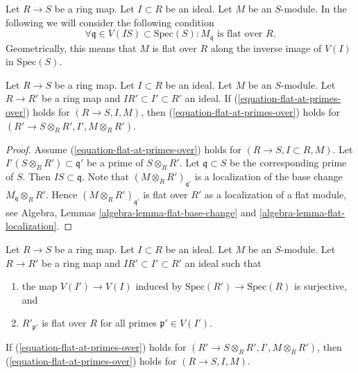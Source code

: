 \noindent
Let $R \to S$ be a ring map.
Let $I \subset R$ be an ideal.
Let $M$ be an $S$-module.
In the following we will consider the following condition
\begin{equation}
\label{equation-flat-at-primes-over}
\forall \mathfrak q \in V(IS) \subset \text{Spec}(S) :
M_{\mathfrak q}\text{ is flat over }R.
\end{equation}
Geometrically, this means that $M$ is flat over $R$ along the inverse
image of $V(I)$ in $\text{Spec}(S)$.

\begin{lemma}
\label{lemma-base-change-flat-at-primes-over}
Let $R \to S$ be a ring map.
Let $I \subset R$ be an ideal.
Let $M$ be an $S$-module.
Let $R \to R'$ be a ring map and $IR' \subset I' \subset R'$ an ideal.
If (\ref{equation-flat-at-primes-over}) holds for
$(R \to S, I, M)$, then (\ref{equation-flat-at-primes-over})
holds for $(R' \to S \otimes_R R', I', M \otimes_R R')$.
\end{lemma}

\begin{proof}
Assume (\ref{equation-flat-at-primes-over}) holds for
$(R \to S, I \subset R, M)$.
Let $I'(S \otimes_R R') \subset \mathfrak q'$ be a prime of $S \otimes_R R'$.
Let $\mathfrak q \subset S$ be the corresponding prime of $S$.
Then $IS \subset \mathfrak q$. Note that $(M \otimes_R R')_{\mathfrak q'}$
is a localization of the base change $M_{\mathfrak q} \otimes_R R'$.
Hence $(M \otimes_R R')_{\mathfrak q'}$ is flat over $R'$ as a localization
of a flat module, see
Algebra, Lemmas \ref{algebra-lemma-flat-base-change} and
\ref{algebra-lemma-flat-localization}.
\end{proof}

\begin{lemma}
\label{lemma-flat-descent-flat-at-primes-over}
Let $R \to S$ be a ring map.
Let $I \subset R$ be an ideal.
Let $M$ be an $S$-module.
Let $R \to R'$ be a ring map and $IR' \subset I' \subset R'$ an ideal
such that
\begin{enumerate}
\item the map $V(I') \to V(I)$ induced by
$\text{Spec}(R') \to \text{Spec}(R)$ is surjective, and
\item $R'_{\mathfrak p'}$ is flat over $R$ for all primes
$\mathfrak p' \in V(I')$.
\end{enumerate}
If (\ref{equation-flat-at-primes-over}) holds for
$(R' \to S \otimes_R R', I', M \otimes_R R')$, then
(\ref{equation-flat-at-primes-over}) holds for $(R \to S, I, M)$.
\end{lemma}

